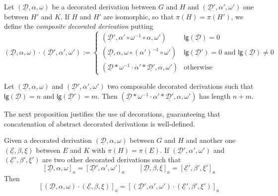 \documentclass[a4paper,UKenglish,cleveref,pdftex, thm-restate,numberwithinsect]{lipics}
\newcommand{\dder}[1]{\mathscr{#1}}
\newcommand{\der}[1]{\underline{\dder{#1}}}
\newcommand{\lgh}[0]{\mathsf{lg}}
\begin{document}
\begin{definition}\label{def:conc}
Let $(\der{D}, \alpha, \omega)$ be a decorated derivation between $G$ and $H$ and $(\der{D}', \alpha', \omega')$ one between $H'$ and $K$. If $H$ and $H'$ are isomorphic, so that $\pi(H)=\pi(H')$, we define the  \emph{composite decorated derivation} putting
\[(\der{D}, \alpha, \omega)\cdot (\der{D}', \alpha', \omega'):=\begin{cases}
(\der{D}', \alpha'\circ \omega^{-1}\circ \alpha, \omega')	&\lgh(\der{D})=0 \\
	(\der{D}, \alpha, \omega \circ (\alpha')^{-1}\circ \omega')&\lgh(\der{D}')=0 \text{ and } \lgh(\der{D})\neq 0\\
(\der{D}*\omega^{-1}\cdot \alpha'*\der{D'}, \alpha, \omega')	&\text{otherwise}
\end{cases}\]
\end{definition}


\begin{remark}\label{rem:lgt}
	Let $(\der{D}, \alpha, \omega)$ and $(\der{D}', \alpha', \omega')$ two composable decorated derivations   such that $\lgh(\der{D})=n$ and $\lgh(\der{D}')=m$.	 Then $(\der{D}*\omega^{-1}\cdot \alpha'*\der{D'}, \alpha, \omega')$ has length $n+m$.
\end{remark}

The next proposition justifies the use of decorations, guaranteeing that concatenation of abstract decorated derivations is well-defined.
\begin{lemma}\label{lem:conc}
	Given a decorated derivation $(\der{D}, \alpha, \omega)$  between $G$ and $H$ and  another one $(\der{E}, \beta, \xi)$ between $E$ and $K$ with $\pi(H)=\pi(E)$. If  $(\der{D}', \alpha', \omega')$ and $(\der{E}', \beta', \xi')$ are two other decorated derivations such that
	\[[\der{D}, \alpha, \omega]_a = [\der{D}', \alpha', \omega']_a \qquad [\der{D}, \beta, \xi]_a=[\der{E}', \beta', \xi']_a\]
	Then
	\[[(\der{D}, \alpha, \omega)\cdot (\der{E}, \beta, \xi)]_a=[(\der{D}', \alpha', \omega')\cdot (\der{E}', \beta', \xi')]_a\]
\end{lemma}
\end{document}
